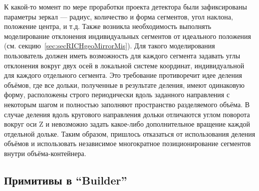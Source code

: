 \bigskip

К какой-то момент по мере проработки проекта детектора были зафиксированы параметры зеркал --- радиус, количество и форма сегментов, угол наклона, положение центра, и т.д. Также возникла необходимость выполнять моделирование отклонения индивидуальных сегментов от идеального положения (см. секцию~\ref{sec:secRICHgeoMirrorMis}). Для такого моделирования пользователь должен иметь возможность для каждого сегмента задавать углы отклонения вокруг двух осей в локальной системе координат, индивидуальной для каждого отдельного сегмента. Это требование противоречит идее деления объёмов, где все дольки, полученные в результате деления, имеют одинаковую форму, расположены строго периодически вдоль заданного направления с некоторым шагом и полностью заполняют пространство разделяемого объёма. В случае деления вдоль кругового направления дольки отличаются углом поворота вокруг оси Z и невозможно  задать какое-либо дополнительное вращение каждой отдельной дольке. Таким образом, пришлось отказаться от использования деления объёмов и использовать независимое многократное позиционирование сегментов внутри объёма-контейнера.

%                                                

\subsection{Примитивы в ``Builder''}\label{sec:Primitives}

